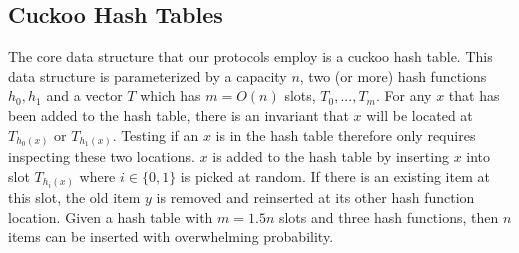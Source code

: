 \subsection{Cuckoo Hash Tables}

The core data structure that our protocols employ is a cuckoo hash table. This data structure is parameterized by a capacity $n$, two (or more) hash functions $h_0, h_1$ and a vector $T$ which has $m=O(n)$ slots, $T_0, ..., T_m$. For any $x$ that has been added to the hash table, there is an invariant that $x$ will be located at $T_{h_0(x)}$ or $T_{h_1(x)}$. Testing if an $x$ is in the hash table therefore only requires inspecting these two locations. $x$ is added to the hash table by inserting $x$ into slot $T_{h_i(x)}$ where $i\in \{0,1\}$ is picked at random. If there is an existing item at this slot, the old item $y$ is removed and reinserted at its other hash function location. Given a hash table with $m=1.5n$ slots and three hash functions, then $n$ items can be inserted with overwhelming probability\cite{DRRT18}. 